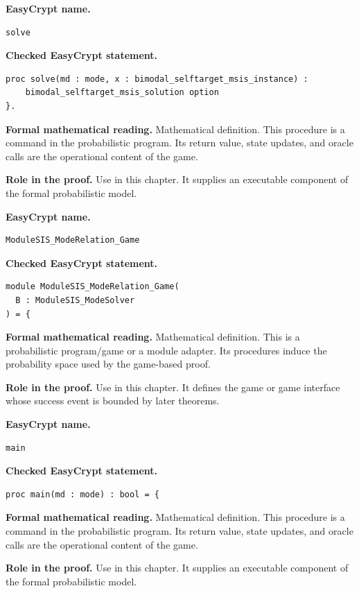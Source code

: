\begin{formaldefinition}
\noindent\textbf{EasyCrypt name.}
\begin{lstlisting}[language=EasyCrypt,basicstyle=\ttfamily\scriptsize]
solve
\end{lstlisting}
\noindent\textbf{Checked EasyCrypt statement.}
\begin{lstlisting}[language=EasyCrypt,basicstyle=\ttfamily\scriptsize]
proc solve(md : mode, x : bimodal_selftarget_msis_instance) :
    bimodal_selftarget_msis_solution option
}.
\end{lstlisting}
\noindent\textbf{Formal mathematical reading.}
Mathematical definition. This procedure is a command in the probabilistic program.  Its return value, state updates, and oracle calls are the operational content of the game.

\noindent\textbf{Role in the proof.}
Use in this chapter. It supplies an executable component of the formal probabilistic model.

\end{formaldefinition}

\begin{formaldefinition}
\noindent\textbf{EasyCrypt name.}
\begin{lstlisting}[language=EasyCrypt,basicstyle=\ttfamily\scriptsize]
ModuleSIS_ModeRelation_Game
\end{lstlisting}
\noindent\textbf{Checked EasyCrypt statement.}
\begin{lstlisting}[language=EasyCrypt,basicstyle=\ttfamily\scriptsize]
module ModuleSIS_ModeRelation_Game(
  B : ModuleSIS_ModeSolver
) = {
\end{lstlisting}
\noindent\textbf{Formal mathematical reading.}
Mathematical definition. This is a probabilistic program/game or a module adapter.  Its procedures induce the probability space used by the game-based proof.

\noindent\textbf{Role in the proof.}
Use in this chapter. It defines the game or game interface whose success event is bounded by later theorems.

\end{formaldefinition}

\begin{formaldefinition}
\noindent\textbf{EasyCrypt name.}
\begin{lstlisting}[language=EasyCrypt,basicstyle=\ttfamily\scriptsize]
main
\end{lstlisting}
\noindent\textbf{Checked EasyCrypt statement.}
\begin{lstlisting}[language=EasyCrypt,basicstyle=\ttfamily\scriptsize]
proc main(md : mode) : bool = {
\end{lstlisting}
\noindent\textbf{Formal mathematical reading.}
Mathematical definition. This procedure is a command in the probabilistic program.  Its return value, state updates, and oracle calls are the operational content of the game.

\noindent\textbf{Role in the proof.}
Use in this chapter. It supplies an executable component of the formal probabilistic model.

\end{formaldefinition}

